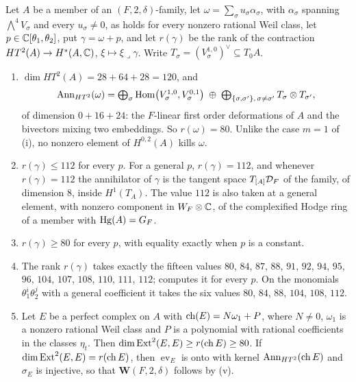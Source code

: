 \begin{theorem}[The polarised criterion for a quartic field at $n=2$]
\label{thm:quarticp2prime}
Let $A$ be a member of an $(F,2,\delta)$-family, let
$\omega=\sum_{\sigma}u_{\sigma}\alpha_{\sigma}$, with $\alpha_{\sigma}$ spanning
$\bigwedge^{4}V_{\sigma}$ and every $u_{\sigma}\ne0$, as holds for every
nonzero rational Weil class, let $p\in\mathbb{C}[\theta_{1},\theta_{2}]$, put
$\gamma=\omega+p$, and let $r(\gamma)$ be the rank of the contraction
$HT^{2}(A)\to H^{*}(A,\mathbb{C})$, $\xi\mapsto\xi\lrcorner\gamma$. Write
$T_{\sigma}=(V_{\sigma}^{1,0})^{\vee}\subseteq T_{0}A$.
\begin{enumerate}[label=\textup{(\roman*)},leftmargin=2.6em,itemsep=2pt]
\item $\dim HT^{2}(A)=28+64+28=120$, and
  \[
    \operatorname{Ann}_{HT^{2}}(\omega)=\textstyle\bigoplus_{\sigma}
    \operatorname{Hom}\bigl(V_{\sigma}^{1,0},V_{\sigma}^{0,1}\bigr)\;\oplus\;
    \bigoplus_{\{\sigma,\sigma'\},\,\sigma\ne\sigma'}T_{\sigma}\otimes T_{\sigma'},
  \]
  of dimension $0+16+24$: the $F$-linear first order deformations of $A$ and
  the bivectors mixing two embeddings. So $r(\omega)=80$. Unlike the case
  $m=1$ of (i), no nonzero element of $H^{0,2}(A)$ kills
  $\omega$.
\item $r(\gamma)\le112$ for every $p$. For a general $p$, $r(\gamma)=112$, and
  whenever $r(\gamma)=112$ the annihilator of $\gamma$ is the tangent space
  $T_{[A]}\mathcal{D}_{F}$ of the family, of dimension $8$, inside $H^{1}(T_{A})$. The
  value $112$ is also taken at a general element, with nonzero component in
  $W_{F}\otimes\mathbb{C}$, of the complexified Hodge ring of a member with
  $\operatorname{Hg}(A)=G_{F}$.
\item $r(\gamma)\ge80$ for every $p$, with equality exactly when $p$ is a
  constant.
\item The rank $r(\gamma)$ takes exactly the fifteen values $80$, $84$, $87$,
  $88$, $91$, $92$, $94$, $95$, $96$, $104$, $107$, $108$, $110$, $111$,
  $112$;  computes it for every $p$. On the monomials
  $\theta_{1}^{i}\theta_{2}^{j}$ with a general coefficient it takes the
  six values $80$, $84$, $88$, $104$, $108$, $112$.
\item Let $E$ be a perfect complex on $A$ with $\operatorname{ch}(E)=N\omega_{1}+P$, where
  $N\ne0$, $\omega_{1}$ is a nonzero rational Weil class and $P$ is a
  polynomial with rational coefficients in the classes $\eta_{t}$. Then
  $\dim\operatorname{Ext}^{2}(E,E)\ge r(\operatorname{ch} E)\ge80$. If $\dim\operatorname{Ext}^{2}(E,E)=r(\operatorname{ch} E)$, then
  $\operatorname{ev}_{E}$ is onto with kernel $\operatorname{Ann}_{HT^{2}}(\operatorname{ch} E)$ and
  $\sigma_{E}$ is injective, so that $\mathbf{W}(F,2,\delta)$ follows by
  (v).
\end{enumerate}
\end{theorem}

